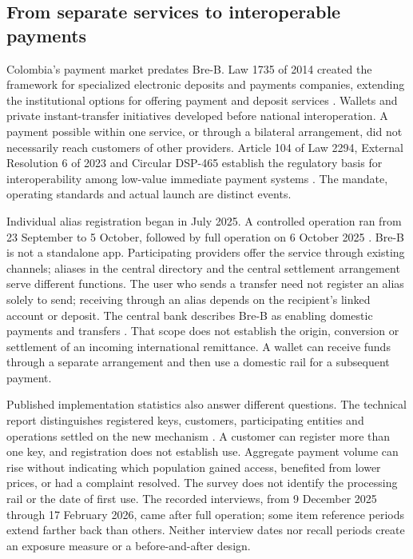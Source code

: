 \documentclass[12pt]{article}
\begin{document}
\subsection{From separate services to interoperable payments}
Colombia's payment market predates Bre-B. Law 1735 of 2014 created the framework for specialized electronic deposits and payments companies, extending the institutional options for offering payment and deposit services \citep{law1735}. Wallets and private instant-transfer initiatives developed before national interoperation. A payment possible within one service, or through a bilateral arrangement, did not necessarily reach customers of other providers. Article 104 of Law 2294, External Resolution 6 of 2023 and Circular DSP-465 establish the regulatory basis for interoperability among low-value immediate payment systems \citep{banrepreg,banreptechnical2026}. The mandate, operating standards and actual launch are distinct events.

Individual alias registration began in July 2025. A controlled operation ran from 23 September to 5 October, followed by full operation on 6 October 2025 \citep{banreppilot,banreptechnical2026,banrep2026}. Bre-B is not a standalone app. Participating providers offer the service through existing channels; aliases in the central directory and the central settlement arrangement serve different functions. The user who sends a transfer need not register an alias solely to send; receiving through an alias depends on the recipient's linked account or deposit. The central bank describes Bre-B as enabling domestic payments and transfers \citep{banrepfaq,banreptechnical2026}. That scope does not establish the origin, conversion or settlement of an incoming international remittance. A wallet can receive funds through a separate arrangement and then use a domestic rail for a subsequent payment.

Published implementation statistics also answer different questions. The technical report distinguishes registered keys, customers, participating entities and operations settled on the new mechanism \citep{banreptechnical2026}. A customer can register more than one key, and registration does not establish use. Aggregate payment volume can rise without indicating which population gained access, benefited from lower prices, or had a complaint resolved. The survey does not identify the processing rail or the date of first use. The recorded interviews, from 9 December 2025 through 17 February 2026, came after full operation; some item reference periods extend farther back than others. Neither interview dates nor recall periods create an exposure measure or a before-and-after design.
\end{document}
